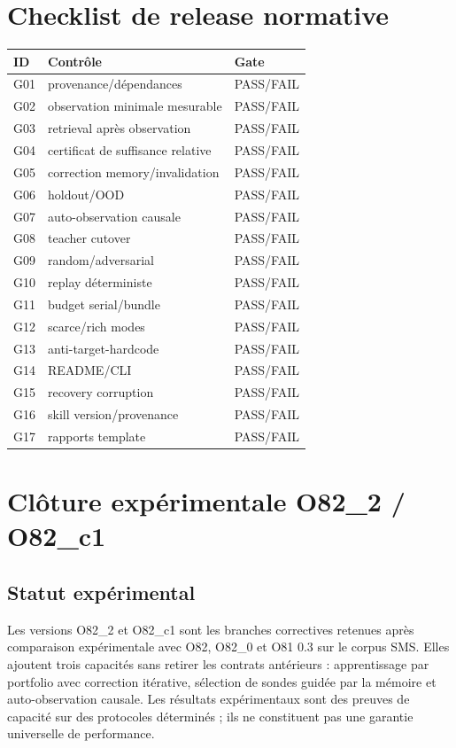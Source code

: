 \documentclass[11pt,a4paper]{report}
\begin{document}
\chapter{Checklist de release normative}
\begin{longtable}{p{}p{}p{}}
\toprule ID & Contrôle & Gate \\ \midrule
G01 & provenance/dépendances & PASS/FAIL \\
G02 & observation minimale mesurable & PASS/FAIL \\
G03 & retrieval après observation & PASS/FAIL \\
G04 & certificat de suffisance relative & PASS/FAIL \\
G05 & correction memory/invalidation & PASS/FAIL \\
G06 & holdout/OOD & PASS/FAIL \\
G07 & auto-observation causale & PASS/FAIL \\
G08 & teacher cutover & PASS/FAIL \\
G09 & random/adversarial & PASS/FAIL \\
G10 & replay déterministe & PASS/FAIL \\
G11 & budget serial/bundle & PASS/FAIL \\
G12 & scarce/rich modes & PASS/FAIL \\
G13 & anti-target-hardcode & PASS/FAIL \\
G14 & README/CLI & PASS/FAIL \\
G15 & recovery corruption & PASS/FAIL \\
G16 & skill version/provenance & PASS/FAIL \\
G17 & rapports template & PASS/FAIL \\
\bottomrule
\end{longtable}


\chapter{Clôture expérimentale O82\_2 / O82\_c1}
\section{Statut expérimental}
Les versions O82\_2 et O82\_c1 sont les branches correctives retenues après comparaison expérimentale avec O82, O82\_0 et O81 0.3 sur le corpus SMS. Elles ajoutent trois capacités sans retirer les contrats antérieurs : apprentissage par portfolio avec correction itérative, sélection de sondes guidée par la mémoire et auto-observation causale. Les résultats expérimentaux sont des preuves de capacité sur des protocoles déterminés ; ils ne constituent pas une garantie universelle de performance.
\end{document}
